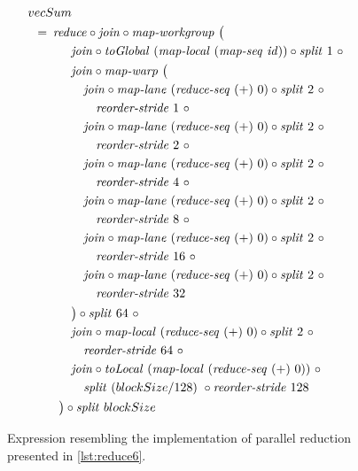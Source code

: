 \begin{figure}
  \begin{align*}
    &\hspace{-1.5em}vecSum\\
    &\hspace{-2em}\quad\begin{aligned}
      &=\hspace{.2em}
        \reduce \circ \join \circ \mapWorkgroup\ \big(\\
      &\qquad\quad \join \circ \toGlobal\ (\mapLocal\ (\mapSeq\ \id)) \circ \splitN\ 1\ \circ\\
      &\qquad\quad \join \circ \mapWarp\ \big(\\
      &\qquad\qquad \join \circ \mapLane\ (\reduceSeq\ (+)\ 0) \circ \splitN\ 2\ \circ\\
      &\qquad\qquad\quad \reorderStride\ 1\ \circ\\
      &\qquad\qquad \join \circ \mapLane\ (\reduceSeq\ (+)\ 0) \circ \splitN\ 2\ \circ\\
      &\qquad\qquad\quad \reorderStride\ 2\ \circ\\
      &\qquad\qquad \join \circ \mapLane\ (\reduceSeq\ (+)\ 0) \circ \splitN\ 2\ \circ\\
      &\qquad\qquad\quad \reorderStride\ 4\ \circ\\
      &\qquad\qquad \join \circ \mapLane\ (\reduceSeq\ (+)\ 0) \circ \splitN\ 2\ \circ\\
      &\qquad\qquad\quad \reorderStride\ 8\ \circ\\
      &\qquad\qquad \join \circ \mapLane\ (\reduceSeq\ (+)\ 0) \circ \splitN\ 2\ \circ\\
      &\qquad\qquad\quad \reorderStride\ 16\ \circ\\
      &\qquad\qquad \join \circ \mapLane\ (\reduceSeq\ (+)\ 0) \circ \splitN\ 2\ \circ\\
      &\qquad\qquad\quad \reorderStride\ 32\\
      &\qquad\quad\big) \circ \splitN\ 64\ \circ\\
      &\qquad\quad \join \circ \mapLocal\ (\reduceSeq\ (+)\ 0) \circ \splitN\ 2\ \circ\\
      &\qquad\qquad \reorderStride\ 64\ \circ\\
      &\qquad\quad \join \circ \toLocal\ (\mapLocal\ (\reduceSeq\ (+)\ 0))\ \circ\\
      &\qquad\qquad\splitN\ (blockSize/128)\ \circ \reorderStride\ 128\\
      &\qquad\big) \circ \splitN\ blockSize
    \end{aligned}
  \end{align*}
  \caption{Expression resembling the implementation of parallel reduction presented in \autoref{lst:reduce6}.}
  \label{eq:reduce16}
\end{figure}
